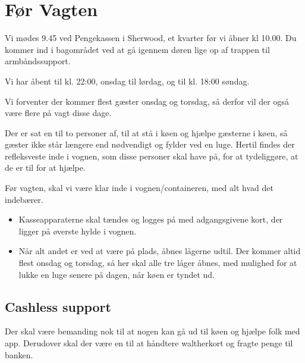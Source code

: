 \section{Før Vagten}
\label{sec:pre-vagten}

Vi mødes 9.45 ved Pengekassen i Sherwood, et kvarter før vi åbner kl 10.00.
Du kommer ind i bagområdet ved at gå igennem døren lige op af trappen til armbåndssupport.

Vi har åbent til kl. 22:00, onsdag til lørdag, og til kl. 18:00 søndag.

Vi forventer der kommer flest gæster onsdag og torsdag, 
så derfor vil der også være flere på vagt disse dage.

Der er sat en til to personer af, til at stå i køen og hjælpe gæsterne i køen, 
så gæster ikke står længere end nødvendigt og fylder ved en luge.
Hertil findes der refleksveste inde i vognen, som disse personer skal have på, 
for at tydeliggøre, at de er til for at hjælpe.

Før vagten, skal vi være klar inde i vognen/containeren, med alt hvad det indebærer. 
\begin{itemize}
	\item Kasseapparaterne skal tændes og logges på med adgangsgivene kort, der ligger på øverste hylde i vognen.
	\item Når alt andet er ved at være på plads, åbnes
	lågerne udtil. Der kommer altid flest onsdag og torsdag, så her skal alle tre låger åbnes, 
	med mulighed for at lukke en luge senere på dagen, når køen er tyndet ud.
\end{itemize}

\subsection{Cashless support}
Der skal være bemanding nok til at nogen kan gå ud til køen og hjælpe folk med app. 
Derudover skal der være en til at håndtere waltherkort og fragte penge til banken.